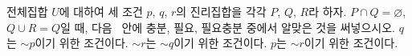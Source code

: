 전체집합 $U$에 대하여 세 조건 $p$, $q$, $r$의 진리집합을 각각 $P$, $Q$, $R$라 하자. $P\cap Q=\varnothing$, $Q\cup R=Q$일 때, 다음 \blank\ 안에 충분, 필요, 필요충분 중에서 알맞은 것을 써넣으시오. 
 $q$는 $\sim p$이기 위한 \blank[2.4em] 조건이다.
 $\sim r$는 $\sim q$이기 위한 \blank[2.4em] 조건이다.
 $p$는 $\sim r$이기 위한 \blank[2.4em] 조건이다.
